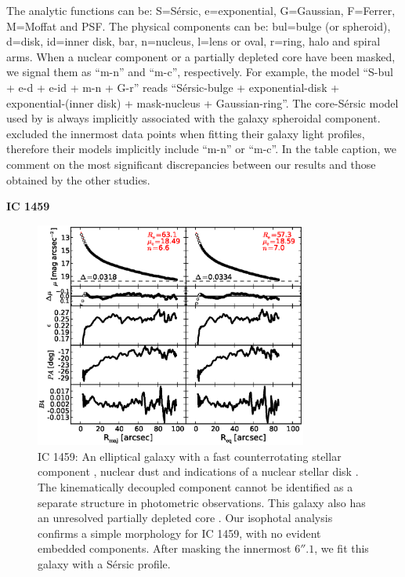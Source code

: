 \documentclass[preprint2]{emulateapj}
\newcommand{\fitfigurewidth}{0.8\textwidth}
\begin{document}
  The analytic functions can be: S=S\'ersic, e=exponential, G=Gaussian, F=Ferrer, M=Moffat and PSF.
  The physical components can be: bul=bulge (or spheroid), d=disk, id=inner disk, bar, n=nucleus, l=lens or oval, r=ring, halo and spiral arms. 
  When a nuclear component or a partially depleted core have been masked, we signal them as ``m-n'' and ``m-c'', respectively.
  For example, the model ``S-bul + e-d + e-id + m-n + G-r'' reads ``S\'ersic-bulge + exponential-disk + exponential-(inner disk) + mask-nucleus + Gaussian-ring''. 
  The core-S\'ersic model used by \cite{rusli2013} is always implicitly associated with the galaxy spheroidal component. 
  \citeauthor{grahamdriver2007} excluded the innermost data points when fitting their galaxy light profiles,  
  therefore their models implicitly include ``m-n'' or ``m-c''. 
  In the table caption, we comment on the most significant discrepancies between our results and those obtained by the other studies. 

  \clearpage\newpage\noindent
  {\bf IC 1459 \\}

  \begin{figure}[h]
  \begin{center}
  \includegraphics[width=\fitfigurewidth]{ic1459_1Dfit.eps}
  \caption{IC 1459: 
  An elliptical galaxy with a fast counterrotating stellar component \citep{franxillingworth1988ic1459,cappellari2002ic1459},
  nuclear dust and indications of a nuclear stellar disk \citep{forbes1994ic1459}.
  The kinematically decoupled component cannot be identified as a separate structure in photometric observations.
  This galaxy also has an unresolved partially depleted core \citep{rusli2013}.  
  Our isophotal analysis confirms a simple morphology for IC 1459, with no evident embedded components.
  After masking the innermost $6''.1$, we fit this galaxy with a S\'ersic profile.  }
  \end{center}
  \end{figure}
\end{document}
